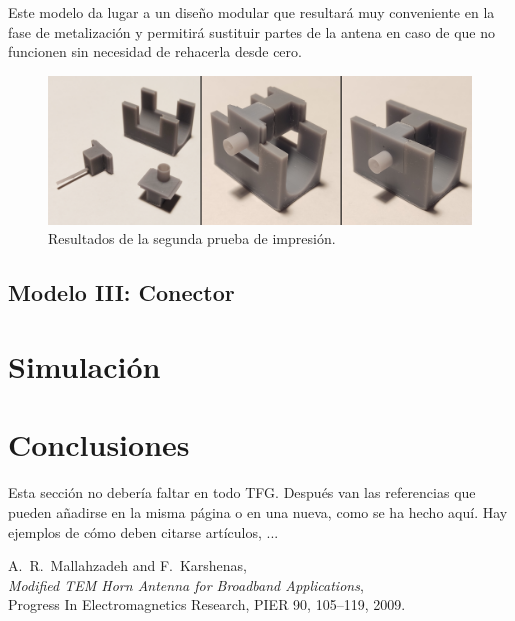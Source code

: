 \documentclass[11pt,a4paper,twoside,pdf]{article}
\numberwithin{equation}{section}
\begin{document}
Este modelo da lugar a un diseño modular que resultará muy conveniente en la fase de metalización y permitirá sustituir partes de la antena en caso de que no funcionen sin necesidad de rehacerla desde cero.
\begin{figure}[!h]
    \centering
    \includegraphics[width=\linewidth]{img/modelos/2025_02_25-Ranuras/modulosPrint.png}
    \caption{Resultados de la segunda prueba de impresión.}
    \label{fig:modulosPrint}
\end{figure}

\subsection{Modelo III: Conector}

\section{Simulación}



\section{Conclusiones}

Esta sección no debería faltar en todo TFG. Después van las referencias que pueden añadirse en la misma página o en una nueva, como se ha hecho aquí. Hay ejemplos de cómo deben citarse artículos, ...



\begin{thebibliography}{100}

A.~R.~Mallahzadeh and F.~Karshenas, \\
{\em Modified TEM Horn Antenna for Broadband Applications}, \\
Progress In Electromagnetics Research, PIER 90, 105--119, 2009.

 
\end{thebibliography}
\end{document}
